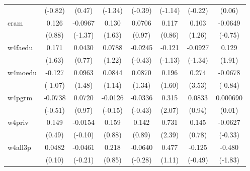 {\begin{tabular}{l*{7}{c}}
            &     (-0.82)         &      (0.47)         &     (-1.34)         &     (-0.39)         &     (-1.14)         &     (-0.22)         &      (0.06)         \\
[1em]
cram        &       0.126         &     -0.0967         &       0.130         &      0.0706         &       0.117         &       0.103         &     -0.0649         \\
            &      (0.88)         &     (-1.37)         &      (1.63)         &      (0.97)         &      (0.86)         &      (1.26)         &     (-0.75)         \\
[1em]
w4faedu     &       0.171         &      0.0430         &      0.0788         &     -0.0245         &      -0.121         &     -0.0927         &       0.129         \\
            &      (1.63)         &      (0.77)         &      (1.22)         &     (-0.43)         &     (-1.13)         &     (-1.34)         &      (1.91)         \\
[1em]
w4moedu     &      -0.127         &      0.0963         &      0.0844         &      0.0870         &       0.196         &       0.274\sym{***}&     -0.0678         \\
            &     (-1.07)         &      (1.48)         &      (1.14)         &      (1.34)         &      (1.60)         &      (3.53)         &     (-0.84)         \\
[1em]
w4pgrm      &     -0.0738         &      0.0720         &     -0.0126         &     -0.0336         &       0.315\sym{*}  &      0.0833         &    0.000690         \\
            &     (-0.51)         &      (0.97)         &     (-0.15)         &     (-0.43)         &      (2.07)         &      (0.94)         &      (0.01)         \\
[1em]
w4priv      &       0.149         &     -0.0154         &       0.159         &       0.142         &       0.731\sym{*}  &       0.145         &     -0.0627         \\
            &      (0.49)         &     (-0.10)         &      (0.88)         &      (0.89)         &      (2.39)         &      (0.78)         &     (-0.33)         \\
[1em]
w4all3p     &      0.0482         &     -0.0461         &       0.218         &     -0.0640         &       0.477         &      -0.125         &      -0.480         \\
            &      (0.10)         &     (-0.21)         &      (0.85)         &     (-0.28)         &      (1.11)         &     (-0.49)         &     (-1.83)         \\

\end{tabular}}
